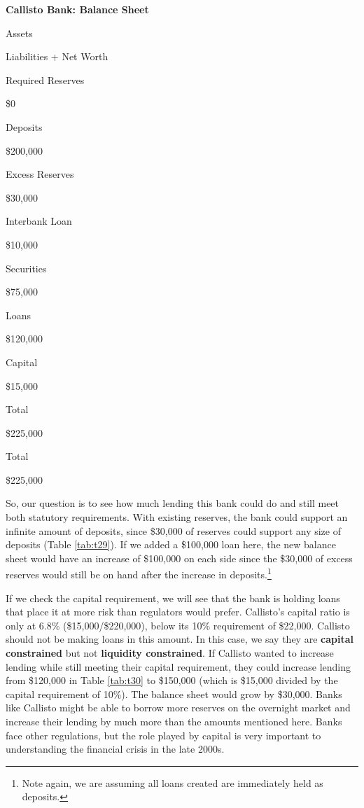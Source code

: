\documentclass[
]{book}
\begin{document}
\label{tab:t28}\textbf{Callisto Bank: Balance Sheet}

Assets

Liabilities + Net Worth

Required Reserves

\$0

Deposits

\$200,000

Excess Reserves

\$30,000

Interbank Loan

\$10,000

Securities

\$75,000

Loans

\$120,000

Capital

\$15,000

Total

\$225,000

Total

\$225,000

So, our question is to see how much lending this bank could do and still meet both statutory requirements. With existing reserves, the bank could support an infinite amount of deposits, since \$30,000 of reserves could support any size of deposits (Table \ref{tab:t29}). If we added a \$100,000 loan here, the new balance sheet would have an increase of \$100,000 on each side since the \$30,000 of excess reserves would still be on hand after the increase in deposits.\footnote{Note again, we are assuming all loans created are immediately held as deposits.}

If we check the capital requirement, we will see that the bank is holding loans that place it at more risk than regulators would prefer. Callisto's capital ratio is only at 6.8\% (\$15,000/\$220,000), below its 10\% requirement of \$22,000. Callisto should not be making loans in this amount. In this case, we say they are \textbf{capital constrained} but not \textbf{liquidity constrained}. If Callisto wanted to increase lending while still meeting their capital requirement, they could increase lending from \$120,000 in Table \ref{tab:t30} to \$150,000 (which is \$15,000 divided by the capital requirement of 10\%). The balance sheet would grow by \$30,000. Banks like Callisto might be able to borrow more reserves on the overnight market and increase their lending by much more than the amounts mentioned here. Banks face other regulations, but the role played by capital is very important to understanding the financial crisis in the late 2000s.
\end{document}
